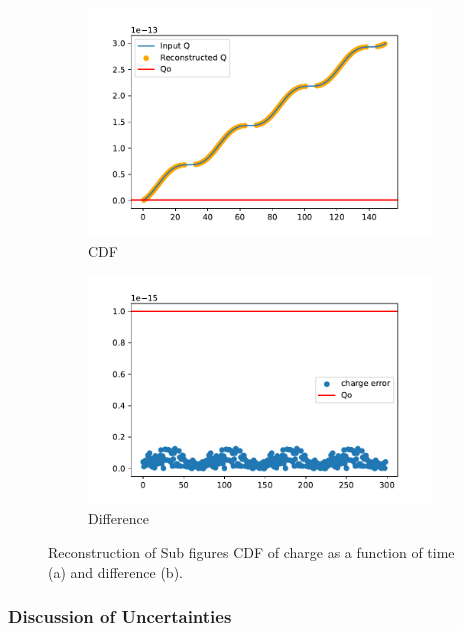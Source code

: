 \begin{figure}
\centering
\begin{subfigure}{.5\textwidth}
  \centering
  \includegraphics[width=\textwidth]{images/reconQ.pdf}
  \caption{CDF}
\end{subfigure}%
\begin{subfigure}{.5\textwidth}
  \centering
  \includegraphics[width=\textwidth]{images/diffQ.pdf}
  \caption{Difference}
\end{subfigure}
\caption{Reconstruction of Sub figures CDF of charge as a function of time (a) and difference (b).}
\label{fig:reconQ}
\end{figure}

\subsubsection{Discussion of Uncertainties}

